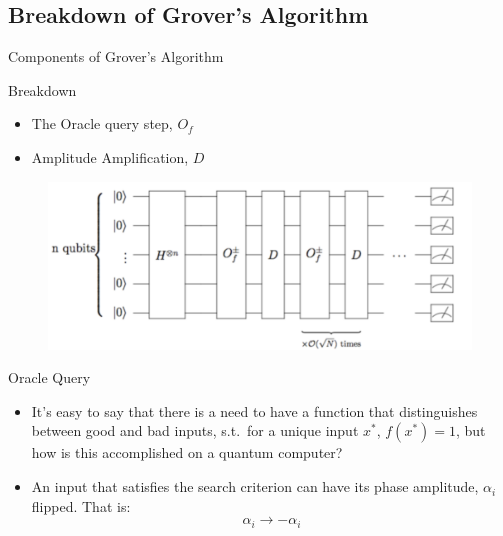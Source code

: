 \documentclass{beamer}
\begin{document}
\subsection{Breakdown of Grover's Algorithm}
\begin{frame}{Components of Grover's Algorithm}
	\begin{block}{Breakdown}
		\begin{multicols}{2}
			\begin{itemize}
				\item The Oracle query step, $O_f$
				\item Amplitude Amplification, $D$
			\end{itemize}

			\columnbreak
		\end{multicols}
	\end{block}
	\begin{figure}[Block representation of Grover's Circuit]
		\centering
		\includegraphics[scale=0.5]{./grover_block.png}
	\end{figure}

\end{frame}

\begin{frame}{Oracle Query}
	\begin{itemize}
		\item It's easy to say that there is a need to have a function that distinguishes between good and bad inputs, s.t.\ for a unique input $x^*$, $f(x^*)=1$, but how is this accomplished on a quantum computer?
		\item An input that satisfies the search criterion can have its phase amplitude, $\alpha_i$ flipped. That is:
		      \begin{equation}
			      \alpha_i \rightarrow -\alpha_i
		      \end{equation}
	\end{itemize}
\end{frame}
\end{document}

